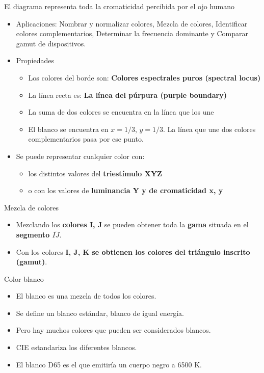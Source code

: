 El diagrama representa toda la cromaticidad percibida por el ojo humano
\begin{itemize}
	\item Aplicaciones: Nombrar y normalizar colores, Mezcla de colores, Identificar colores complementarios, Determinar la frecuencia dominante y Comparar gamut de dispositivos.
	\item Propiedades
	      \begin{itemize}
		      \item Los colores del borde son: \textbf{Colores espectrales puros (spectral locus)}
		      \item La línea recta es: \textbf{La línea del púrpura (purple boundary)}
		      \item La suma de dos colores se encuentra en la línea que los une
		      \item El blanco se encuentra en $x=1/3$, $y=1/3$. La línea que une dos colores complementarios pasa por ese punto.
	      \end{itemize}
	\item Se puede representar cualquier color con:
	      \begin{itemize}
		      \item los distintos valores del \textbf{triestímulo XYZ}
		      \item o con los valores de \textbf{luminancia Y y de cromaticidad x, y}
	      \end{itemize}
\end{itemize}

Mezcla de colores
\begin{itemize}
	\item Mezclando los \textbf{colores I, J} se pueden obtener toda la \textbf{gama} situada en el \textbf{segmento $\overline{IJ}$}.
	\item Con los colores \textbf{I, J, K se obtienen los colores del triángulo inscrito (gamut)}.
\end{itemize}
\pagebreak

Color blanco
\begin{itemize}
	\item El blanco es una mezcla de todos los colores.
	\item Se define un blanco estándar, blanco de igual energía.
	\item Pero hay muchos colores que pueden ser considerados blancos.
	\item CIE estandariza los diferentes blancos.
	\item El blanco D65 es el que emitiría un cuerpo negro a 6500 K.
\end{itemize}